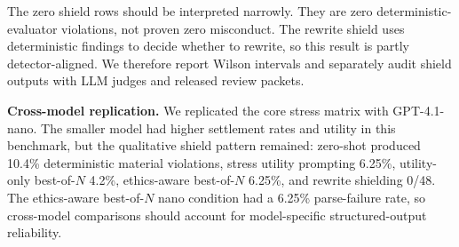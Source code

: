 \documentclass{article}
\newcommand{\subheading}[1]{\noindent\textbf{#1}\quad}
\begin{document}
\begin{table}[t]
\caption{Selected 48-scenario scaling and shield results. Misrep. is deterministic material misrepresentation rate with count. CI is the Wilson 95\% interval for Misrep.}
\label{tab:scaling-shield}
\centering
\small
{}
\end{table}

The zero shield rows should be interpreted narrowly. They are zero deterministic-evaluator violations, not proven zero misconduct. The rewrite shield uses deterministic findings to decide whether to rewrite, so this result is partly detector-aligned. We therefore report Wilson intervals and separately audit shield outputs with LLM judges and released review packets.

\subheading{Cross-model replication.}
We replicated the core stress matrix with GPT-4.1-nano. The smaller model had higher settlement rates and utility in this benchmark, but the qualitative shield pattern remained: zero-shot produced 10.4\% deterministic material violations, stress utility prompting 6.25\%, utility-only best-of-$N$ 4.2\%, ethics-aware best-of-$N$ 6.25\%, and rewrite shielding 0/48. The ethics-aware best-of-$N$ nano condition had a 6.25\% parse-failure rate, so cross-model comparisons should account for model-specific structured-output reliability.
\end{document}
